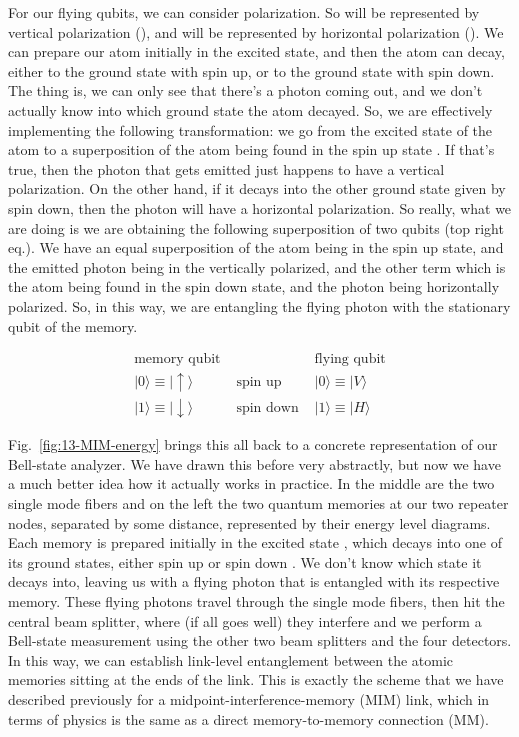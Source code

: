 For our flying qubits, we can consider polarization. So  will be represented by vertical polarization (), and  will be represented by horizontal polarization (). We can prepare our atom initially in the excited state, and then the atom can decay, either to the ground state with spin up, or to the ground state with spin down. The thing is, we can only see that there's a photon coming out, and we don't actually know into which ground state the atom decayed. So, we are effectively implementing the following transformation: we go from the excited state of the atom to a superposition of the atom being found in the spin up state . If that's true, then the photon that gets emitted just happens to have a vertical polarization. On the other hand, if it decays into the other ground state given by spin down, then the photon will have a horizontal polarization. So really, what we are doing is we are obtaining the following superposition of two qubits (top right eq.). We have an equal superposition of the atom being in the spin up state, and the emitted photon being in the vertically polarized, and the other term which is the atom being found in the spin down state, and the photon being horizontally polarized. So, in this way, we are entangling the flying photon with the stationary qubit of the memory.

\begin{equation}
\begin{array}{lll}
\text{memory qubit} & & \text{flying qubit} \\
|0\rangle \equiv|\uparrow\rangle & \text { spin up } & |0\rangle \equiv|V\rangle \\
|1\rangle \equiv|\downarrow\rangle & \text { spin down } & |1\rangle \equiv|H\rangle
\end{array}
\end{equation}

Fig.~\ref{fig:13-MIM-energy} brings this all back to a concrete representation of our Bell-state analyzer. We have drawn this before very abstractly, but now we have a much better idea how it actually works in practice. In the middle are the two single mode fibers and on the left the two quantum memories at our two repeater nodes, separated by some distance, represented by their energy level diagrams. Each memory is prepared initially in the excited state , which decays into one of its ground states, either spin up \ket{\uparrow} or spin down \ket{\downarrow}. We don't know which state it decays into, leaving us with a flying photon that is entangled with its respective memory. These flying photons travel through the single mode fibers, then hit the central beam splitter, where (if all goes well) they interfere and we perform a Bell-state measurement using the other two beam splitters and the four detectors. In this way, we can establish link-level entanglement between the atomic memories sitting at the ends of the link. This is exactly the scheme that we have described previously for a midpoint-interference-memory (MIM) link, which in terms of physics is the same as a direct memory-to-memory connection (MM).

